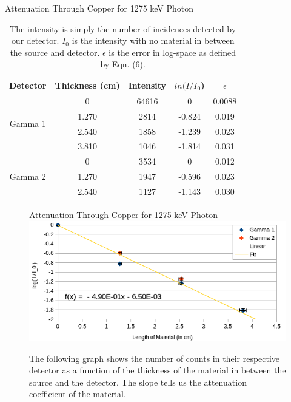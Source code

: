 \documentclass[10pt]{IEEEtran}
\begin{document}
    \begin{table}[!hbtp]
      \begin{center}
        \normalsize{Attenuation Through Copper for 1275 keV Photon}
        \begin{tabular}{|c|c|c|c|c|}	
		   \hline        	
		   Detector & Thickness (cm) & Intensity & $ln(I/I_0$) & $\epsilon$ \\
            \hline
            \multirow{4}{*}{Gamma 1} & 0 & 64616 & 0 & 0.0088 \\
            \hhline{~----}
	        & 1.270 & 2814 & -0.824 & 0.019 \\
	        \hhline{~----}
            & 2.540 & 1858 & -1.239 & 0.023 \\
            \hhline{~----}
            & 3.810 & 1046 & -1.814 & 0.031 \\
            \hline
            \multirow{3}{*}{Gamma 2} & 0 & 3534 & 0 & 0.012 \\
            \hhline{~----}
            & 1.270 & 1947 & -0.596 & 0.023 \\
            \hhline{~----}
            & 2.540 & 1127 & -1.143 & 0.030 \\
            \hline
       \end{tabular}
       \caption{The intensity is simply the number of incidences detected by our detector. $I_0$ is the intensity with no material in between the source and detector. $\epsilon$ is the error in log-space as defined by Eqn. (6).}
       \label{tab:copper1275}
      \end{center}
    \end{table}  
    \begin{figure}[!hpbt]
        \begin{center}
			\normalsize{Attenuation Through Copper for 1275 keV Photon}
			\includegraphics[width=\linewidth]{Attenuation1275Cu}
			\caption{The following graph shows the number of counts in their respective detector as a function of the thickness of the material in between the source and the detector. The slope tells us the attenuation coefficient of the material.}
			\label{fig:1275Cu}
         \end{center}
    \end{figure} 
\end{document}
